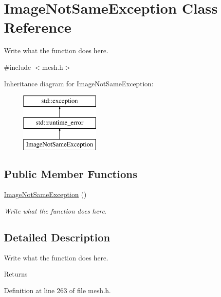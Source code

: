 \hypertarget{classImageNotSameException}{\section{Image\+Not\+Same\+Exception Class Reference}
\label{classImageNotSameException}
}


Write what the function does here.  




{\ttfamily \#include $<$mesh.\+h$>$}

Inheritance diagram for Image\+Not\+Same\+Exception\+:\begin{figure}[H]
\begin{center}
\leavevmode
\includegraphics[height=3.000000cm]{classImageNotSameException}
\end{center}
\end{figure}
\subsection*{Public Member Functions}
\begin{DoxyCompactItemize}
\item 
\hyperlink{classImageNotSameException_adfe4e2c423ac8662a657ab8835e376f0}{Image\+Not\+Same\+Exception} ()
\begin{DoxyCompactList}\small\item\em Write what the function does here. \end{DoxyCompactList}\end{DoxyCompactItemize}


\subsection{Detailed Description}
Write what the function does here. 

\begin{DoxyReturn}{Returns}

\end{DoxyReturn}


Definition at line 263 of file mesh.\+h.



